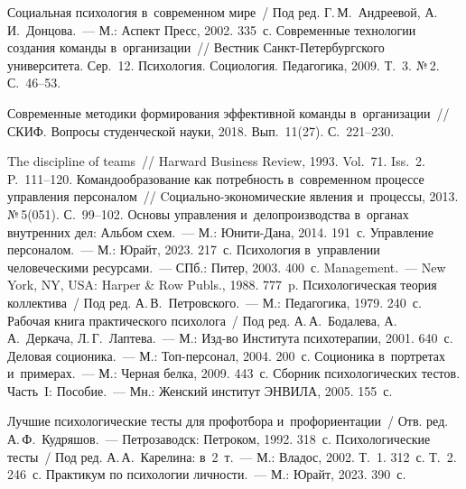 \begin{multicols}{2}
{{\begin{thebibliography}{99}
Социальная психология в~современном мире~/ Под ред. 
Г.\,М.~Андреевой, А.\,И.~Донцова.~--- М.: Аспект Пресс, 2002. 335~с.
 Современные технологии создания команды в~организации~// 
Вестник Санкт-Пе\-тер\-бург\-ско\-го университета. Сер.~12. Психология.  Социология. Педагогика, 2009. Т.~3. №\,2. С.~46--53.

 Современные методики 
формирования эффективной команды в~организации~// СКИФ. Вопросы студенческой науки, 
2018. Вып.~11(27). С.~221--230.

 The discipline of teams~// Harward Business Review, 1993. 
Vol.~71. Iss.~2. P.~111--120.
 Командообразование как потребность в~современном процессе 
управления персоналом~// Cо\-ци\-аль\-но-эко\-но\-ми\-че\-ские явления и~процессы, 2013. 
№\,5(051). С.~99--102. 
 Основы управ\-ле\-ния и~делопроизводства в~органах 
внут\-рен\-них дел: Альбом схем.~--- М.: Юни\-ти-Да\-на, 2014. 191~с.
 Управление персоналом.~--- М.: Юрайт, 2023. 217~с.
 Психология в~управ\-ле\-нии человеческими ресурсами.~--- СПб.: Питер, 2003. 400~с.
 Management.~--- New York, NY, USA: Harper \& 
Row Publs., 1988. 777~p.
Психологическая теория коллектива~/ Под ред. А.\,В.~Пет\-ров\-ско\-го.~--- М.: Педагогика, 1979. 
240~с.
Рабочая книга практического психолога~/ Под ред. А.\,А.~Бодалева, А.\,А.~Деркача, Л.\,Г.~Лаптева.~--- М.: Изд-во 
Института психотерапии, 2001. 640~с.
 Деловая соционика.~--- М.: Топ-пер\-со\-нал, 2004. 200~с.
 Соционика в~портретах и~примерах.~--- М.: Черная белка, 2009. 443~с.
 Сборник психологических тес\-тов. Часть~I: Пособие.~--- Мн.: Женский 
институт \mbox{ЭНВИЛА}, 2005. 155~с.


Лучшие психологические тесты для профотбора и~профориентации~/ Отв. ред. 
А.\,Ф.~Кудряшов.~--- Петрозаводск: Петроком, 1992. 318~с.
Психологические тесты~/ Под ред. А.\,А.~Карелина: в~2~т.~--- М.: Владос, 2002. Т.~1. 312~с. 
Т.~2. 246~с.
 Практикум по психологии личности.~--- М.: Юрайт, 
2023. 390~с.


\end{thebibliography}}}
\end{multicols}
